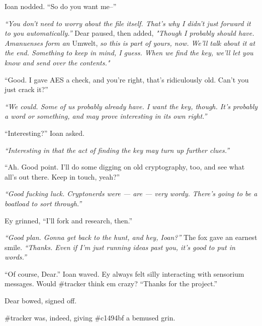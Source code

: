 Ioan nodded. ``So do you want me--''

\emph{``You don't need to worry about the file itself. That's why I didn't just forward it to you automatically.''} Dear paused, then added, \emph{"Though I probably should have. Amanuenses form an} Umwelt, \emph{so this is part of yours, now. We'll talk about it at the end. Something to keep in mind, I guess. When we find the key, we'll let you know and send over the contents."}

``Good. I gave AES a check, and you're right, that's ridiculously old. Can't you just crack it?''

\emph{``We could. Some of us probably already have. I want the key, though. It's probably a word or something, and may prove interesting in its own right.''}

``Interesting?'' Ioan asked.

\emph{``Interesting in that the act of finding the key may turn up further clues.''}

``Ah. Good point. I'll do some digging on old cryptography, too, and see what all's out there. Keep in touch, yeah?''

\emph{``Good fucking luck. Cryptonerds were --- are --- very wordy. There's going to be a boatload to sort through.''}

Ey grinned, ``I'll fork and research, then.''

\emph{``Good plan. Gonna get back to the hunt, and hey, Ioan?''} The fox gave an earnest smile. \emph{``Thanks. Even if I'm just running ideas past you, it's good to put in words.''}

``Of course, Dear.'' Ioan waved. Ey always felt silly interacting with sensorium messages. Would \#tracker think em crazy? ``Thanks for the project.''

Dear bowed, signed off.

\#tracker was, indeed, giving \#c1494bf a bemused grin.

